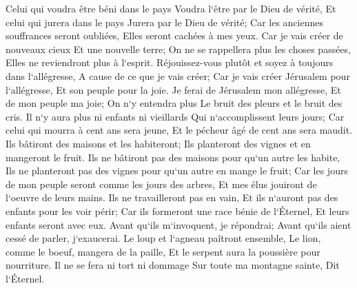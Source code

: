 \verse Celui qui voudra être béni dans le pays Voudra l`être par le Dieu de vérité, Et celui qui jurera dans le pays Jurera par le Dieu de vérité; Car les anciennes souffrances seront oubliées, Elles seront cachées à mes yeux. 
\verse Car je vais créer de nouveaux cieux Et une nouvelle terre; On ne se rappellera plus les choses passées, Elles ne reviendront plus à l`esprit. 
\verse Réjouissez-vous plutôt et soyez à toujours dans l`allégresse, A cause de ce que je vais créer; Car je vais créer Jérusalem pour l`allégresse, Et son peuple pour la joie. 
\verse Je ferai de Jérusalem mon allégresse, Et de mon peuple ma joie; On n`y entendra plus Le bruit des pleurs et le bruit des cris. 
\verse Il n`y aura plus ni enfants ni vieillards Qui n`accomplissent leurs jours; Car celui qui mourra à cent ans sera jeune, Et le pécheur âgé de cent ans sera maudit. 
\verse Ils bâtiront des maisons et les habiteront; Ils planteront des vignes et en mangeront le fruit. 
\verse Ils ne bâtiront pas des maisons pour qu`un autre les habite, Ils ne planteront pas des vignes pour qu`un autre en mange le fruit; Car les jours de mon peuple seront comme les jours des arbres, Et mes élus jouiront de l`oeuvre de leurs mains. 
\verse Ils ne travailleront pas en vain, Et ils n`auront pas des enfants pour les voir périr; Car ils formeront une race bénie de l`Éternel, Et leurs enfants seront avec eux. 
\verse Avant qu`ils m`invoquent, je répondrai; Avant qu`ils aient cessé de parler, j`exaucerai. 
\verse Le loup et l`agneau paîtront ensemble, Le lion, comme le boeuf, mangera de la paille, Et le serpent aura la poussière pour nourriture. Il ne se fera ni tort ni dommage Sur toute ma montagne sainte, Dit l`Éternel. 

